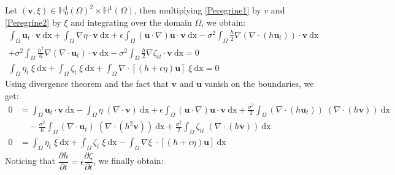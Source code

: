 \documentclass[11pt,a4paper]{article}
\begin{document}
		Let $(\mathbf{v},\xi) \in \mathbb{H}^1_0(\Omega)^2 \times \mathbb{H}^1(\Omega)$, then multiplying \eqref{Peregrine1} by $v$ and \eqref{Peregrine2} by $\xi$ and integrating over the domain $\Omega$, we obtain:   
		\begin{equation}
			\begin{split}
				\int_{\Omega} \! \mathbf{u}_t \cdot \mathbf{v} \: \mathrm{dx} + \int_{\Omega} \! \nabla \eta \cdot \mathbf{v} \: \mathrm{dx} + \epsilon \! \int_{\Omega} \! (\mathbf{u} \cdot \nabla ) \mathbf{u} \cdot \mathbf{v} \: \mathrm{dx} - \sigma^2 \! \int_{\Omega} \! \frac{h}{2} \nabla (\nabla \cdot (h \mathbf{u}_t)) \cdot \mathbf{v} \: \mathrm{dx} \\
				+ \sigma^2 \! \int_{\Omega} \! \frac{h^2}{6} \nabla (\nabla \cdot \mathbf{u}_t) \cdot \mathbf{v} \: \mathrm{dx} - \sigma^2 \! \int_{\Omega} \! \frac{h}{2} \nabla \zeta_{tt} \cdot \mathbf{v} \: \mathrm{dx} = 0\\
				\int_{\Omega}\! \eta_t \; \xi \: \mathrm{dx} +\int_{\Omega}\! \zeta_t \; \xi \: \mathrm{dx} +\int_{\Omega}\! \nabla \cdot [(h+\epsilon\eta) \mathbf{u}] \; \xi \: \mathrm{dx} = 0
			\end{split}
		\end{equation}
		Using divergence theorem and the fact that $\mathbf{v}$ and $\mathbf{u}$ vanish on the boundaries, we get: 
		\begin{equation}
			\begin{split}
				0 &= \int_{\Omega} \! \mathbf{u}_t \cdot \mathbf{v} \: \mathrm{dx} - \int_{\Omega} \! \eta \; (\nabla \cdot \mathbf{v}) \: \mathrm{dx} + \epsilon \! \int_{\Omega} \! (\mathbf{u} \cdot \nabla ) \mathbf{u} \cdot \mathbf{v} \: \mathrm{dx} + \frac{\sigma^2}{2} \! \int_{\Omega} \!  (\nabla \cdot (h \mathbf{u}_t)) \; (\nabla \cdot (h \mathbf{v}) )\: \mathrm{dx} \\
				&\quad - \frac{\sigma^2}{6} \! \int_{\Omega} \! (\nabla \cdot \mathbf{u}_t) \; (\nabla  \cdot (h^2  \mathbf{v})) \: \mathrm{dx} + \frac{\sigma^2}{2} \! \int_{\Omega} \!  \zeta_{tt}  \; (\nabla \cdot( h \mathbf{v})) \: \mathrm{dx}\\
				0 &= \int_{\Omega}\! \eta_t \; \xi \: \mathrm{dx} +\int_{\Omega}\! \zeta_t \; \xi \: \mathrm{dx} -\int_{\Omega}\! \nabla \xi \; \cdot [(h+\epsilon\eta) \mathbf{u}]  \: \mathrm{dx}
			\end{split} 
		\end{equation}
		Noticing that $\dfrac{\partial h}{\partial t} = \epsilon \dfrac{\partial 
		\zeta}{\partial t}$, we finally obtain: 
\end{document}
